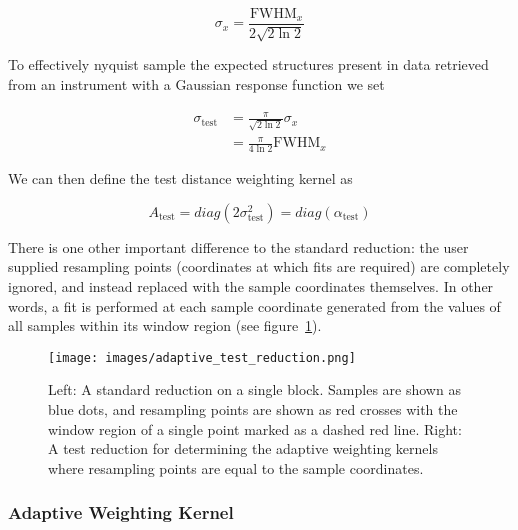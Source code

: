 \begin{equation}
    \sigma_x = \frac{\text{FWHM}_x}{2 \sqrt{2 \ln 2}}
    \label{eq:equation34}
\end{equation}

To effectively nyquist sample the expected structures present in data retrieved
from an instrument with a Gaussian response function we set

\begin{align}
    \sigma_{\text{test}} &= \frac{\pi}{\sqrt{2 \ln{2}}}
                            \sigma_x \nonumber \\
                         &= \frac{\pi}{4\ln{2}} \text{FWHM}_x
    \label{eq:equation36}
\end{align}

We can then define the test distance weighting kernel as

\begin{equation}
    A_{\text{test}} = diag({2 \sigma_{\text{test}}^2})
                    = diag(\alpha_{\text{test}})
    \label{eq:equation33}
\end{equation}

There is one other important difference to the standard reduction:
the user supplied resampling points (coordinates at which fits are required)
are completely ignored, and instead replaced with the sample coordinates
themselves.
In other words, a fit is performed at each sample coordinate generated from
the values of all samples within its window region (see
figure~\ref{fig:adaptive-test_reduction}).

\begin{figure}[H]
  \begin{center}
  \texttt{[image: images/adaptive\_test\_reduction.png]}
  \caption{Left: A standard reduction on a single block.  Samples are shown
           as blue dots, and resampling points are shown as red crosses with
           the window region of a single point marked as a dashed red line.
           Right: A test reduction for determining the adaptive weighting
           kernels where resampling points are equal to the sample coordinates.}
  \label{fig:adaptive-test_reduction}
  \end{center}
\end{figure}

\subsubsection{Adaptive Weighting Kernel}
\label{subsubsec:adaptive-weighting-kernel}

